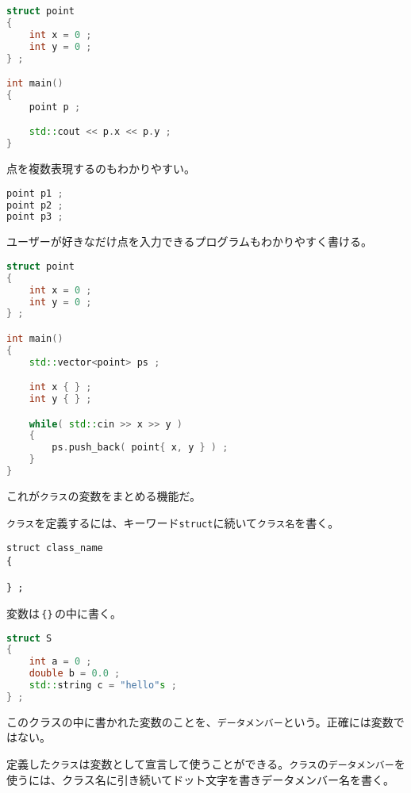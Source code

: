 \begin{lstlisting}[language={C++}]
struct point
{
    int x = 0 ;
    int y = 0 ;
} ;

int main()
{
    point p ;

    std::cout << p.x << p.y ;
}
\end{lstlisting}

点を複数表現するのもわかりやすい。

\begin{lstlisting}[language={C++}]
point p1 ;
point p2 ;
point p3 ;
\end{lstlisting}

ユーザーが好きなだけ点を入力できるプログラムもわかりやすく書ける。

\begin{lstlisting}[language={C++}]
struct point
{
    int x = 0 ;
    int y = 0 ;
} ;

int main()
{
    std::vector<point> ps ;

    int x { } ;
    int y { } ;

    while( std::cin >> x >> y )
    {
        ps.push_back( point{ x, y } ) ;
    }    
}
\end{lstlisting}

これが\texttt{クラス}の変数をまとめる機能だ。

\texttt{クラス}を定義するには、キーワード\texttt{struct}に続いて\texttt{クラス名}を書く。

\begin{lstlisting}[style=grammar]
struct class_name 
{

} ;
\end{lstlisting}

変数は\,\texttt{\{\}}\,の中に書く。

\begin{lstlisting}[language={C++}]
struct S
{
    int a = 0 ;
    double b = 0.0 ;
    std::string c = "hello"s ;
} ;
\end{lstlisting}

このクラスの中に書かれた変数のことを、\texttt{データメンバー}という。正確には変数ではない。

定義した\texttt{クラス}は変数として宣言して使うことができる。\texttt{クラス}の\texttt{データメンバー}を使うには、クラス名に引き続いてドット文字を書きデータメンバー名を書く。


